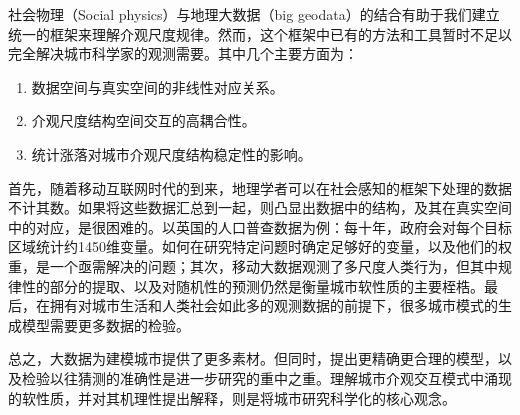 社会物理（Social physics）与地理大数据（big geodata）的结合有助于我们建立统一的框架来理解介观尺度规律。然而，这个框架中已有的方法和工具暂时不足以完全解决城市科学家的观测需要。其中几个主要方面为：\begin{enumerate}
    \item 数据空间与真实空间的非线性对应关系。
    \item 介观尺度结构空间交互的高耦合性。
    \item 统计涨落对城市介观尺度结构稳定性的影响。
\end{enumerate} 首先，随着移动互联网时代的到来，地理学者可以在社会感知的框架下处理的数据不计其数。如果将这些数据汇总到一起，则凸显出数据中的结构，及其在真实空间中的对应，是很困难的。以英国的人口普查数据为例：每十年，政府会对每个目标区域统计约1450维变量。如何在研究特定问题时确定足够好的变量，以及他们的权重，是一个亟需解决的问题；其次，移动大数据观测了多尺度人类行为，但其中规律性的部分的提取、以及对随机性的预测仍然是衡量城市软性质的主要桎梏\cite{song2010limits,barter2019manifold,dalziel2013human}。最后，在拥有对城市生活和人类社会如此多的观测数据的前提下，很多城市模式的生成模型需要更多数据的检验\cite{makse1995modelling,wilson2003development,rozenfeld2008laws}。


总之，大数据为建模城市提供了更多素材。但同时，提出更精确更合理的模型，以及检验以往猜测的准确性是进一步研究的重中之重。理解城市介观交互模式中涌现的软性质，并对其机理性提出解释，则是将城市研究科学化的核心观念。


